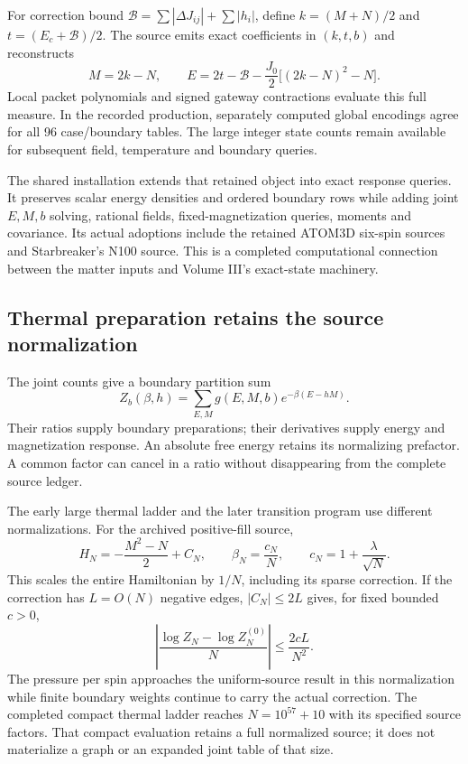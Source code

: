 For correction bound $\mathcal B=\sum|\Delta J_{ij}|+\sum|h_i|$, define $k=(M+N)/2$ and $t=(E_c+\mathcal B)/2$. The source emits exact coefficients in $(k,t,b)$ and reconstructs
\begin{equation}
 M=2k-N,\qquad
 E=2t-\mathcal B-\frac{J_0}{2}\big[(2k-N)^2-N\big].
\end{equation}
Local packet polynomials and signed gateway contractions evaluate this full measure. In the recorded production, separately computed global encodings agree for all 96 case/boundary tables. The large integer state counts remain available for subsequent field, temperature and boundary queries.

The shared installation extends that retained object into exact response queries. It preserves scalar energy densities and ordered boundary rows while adding joint $E,M,b$ solving, rational fields, fixed-magnetization queries, moments and covariance. Its actual adoptions include the retained ATOM3D six-spin sources and Starbreaker's N100 source. This is a completed computational connection between the matter inputs and Volume III's exact-state machinery.

\subsection{Thermal preparation retains the source normalization}

The joint counts give a boundary partition sum
\begin{equation}
 Z_b(\beta,h)=\sum_{E,M}g(E,M,b)e^{-\beta(E-hM)}.
\end{equation}
Their ratios supply boundary preparations; their derivatives supply energy and magnetization response. An absolute free energy retains its normalizing prefactor. A common factor can cancel in a ratio without disappearing from the complete source ledger.

The early large thermal ladder and the later transition program use different normalizations. For the archived positive-fill source,
\begin{equation}
 H_N=-\frac{M^2-N}{2}+C_N,
 \qquad \beta_N=\frac{c_N}{N},\qquad
 c_N=1+\frac{\lambda}{\sqrt N}.
\end{equation}
This scales the entire Hamiltonian by $1/N$, including its sparse correction. If the correction has $L=O(N)$ negative edges, $|C_N|\leq2L$ gives, for fixed bounded $c>0$,
\begin{equation}
 \left|\frac{\log Z_N-\log Z_N^{(0)}}N\right|
 \leq\frac{2cL}{N^2}.
\end{equation}
The pressure per spin approaches the uniform-source result in this normalization while finite boundary weights continue to carry the actual correction. The completed compact thermal ladder reaches $N=10^{57}+10$ with its specified source factors. That compact evaluation retains a full normalized source; it does not materialize a graph or an expanded joint table of that size.

